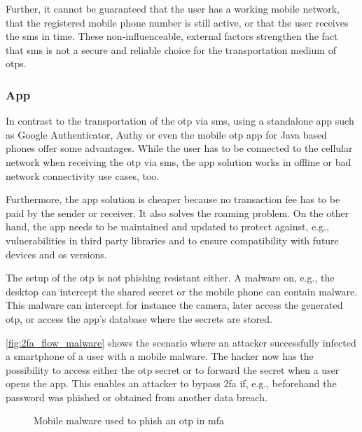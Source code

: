 Further, it cannot be guaranteed that the user has a working mobile network, that the registered mobile phone number is still active, or that the user receives the \gls{sms} in time. These non-influenceable, external factors strengthen the fact that \gls{sms} is not a secure and reliable choice for the transportation medium of \glspl{otp}.

\subsubsection{App}
 
 In contrast to the transportation of the \gls{otp} via \gls{sms}, using a standalone app such as Google Authenticator, Authy or even the mobile \gls{otp} app for Java based phones offer some advantages. While the user has to be connected to the cellular network when receiving the \gls{otp} via \gls{sms}, the app solution works in offline or bad network connectivity use cases, too.
 
 Furthermore, the app solution is cheaper because no transaction fee has to be paid by the sender or receiver. It also solves the roaming problem. On the other hand, the app needs to be maintained and updated to protect against, e.g., vulnerabilities in third party libraries and to ensure compatibility with future devices and \gls{os} versions.
 
 The setup of the \gls{otp} is not phishing resistant either. A malware on, e.g., the desktop can intercept the shared secret or the mobile phone can contain malware. This malware can intercept for instance the camera, later access the generated \gls{otp}, or access the app's database where the secrets are stored.
 
 \autoref{fig:2fa_flow_malware} shows the scenario where an attacker successfully infected a smartphone of a user with a mobile malware. The hacker now has the possibility to access either the \gls{otp} secret or to forward the secret when a user opens the app. This enables an attacker to bypass \gls{2fa} if, e.g., beforehand the password was phished or obtained from another data breach.
 
 \begin{figure}[hbt]
	\centering
	
	\caption[Mobile malware used to phish an \gls{otp} in \gls{mfa}]{Mobile malware used to phish an \gls{otp} in \gls{mfa}\footnotemark}
	\label{fig:2fa_flow_malware}
\end{figure}
 
